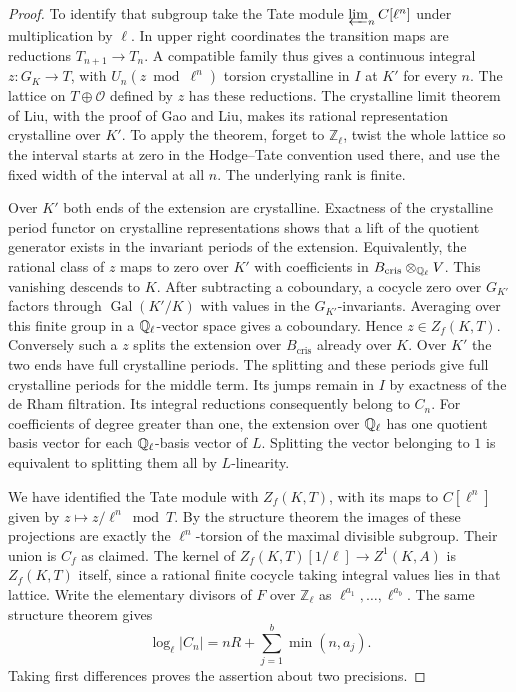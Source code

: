\documentclass[a4paper,11pt]{article}
\theoremstyle{definition}
\theoremstyle{remark}
\newcommand{\ZZ}{\mathbb Z}\newcommand{\ord}{\operatorname{ord}}
\numberwithin{equation}{section}
\begin{document}
\begin{proof}
To identify that subgroup take the Tate module
\(\varprojlim_n C[\ell^n]\) under multiplication by \(\ell\).
In upper right coordinates the transition maps are reductions
\(T_{n+1}\to T_n\). A compatible family thus gives a continuous
integral \(z:G_K\to T\), with \(U_n(z\bmod\ell^n)\) torsion
crystalline in \(I\) at \(K'\) for every \(n\). The lattice on
\(T\oplus\mathcal O\) defined by \(z\) has these reductions.
The crystalline limit theorem of Liu, with the proof of Gao and
Liu, makes its rational representation crystalline over \(K'\).
To apply the theorem, forget to \(\ZZ_\ell\), twist the whole lattice
so the interval starts at zero in the Hodge--Tate convention used
there, and use the fixed width of the interval at all \(n\).
The underlying rank is finite. \cite{II-II-liulimit732,II-II-gaoliulimit732}

Over \(K'\) both ends of the extension are crystalline. Exactness
of the crystalline period functor on crystalline representations
shows that a lift of the quotient generator exists in the invariant
periods of the extension. Equivalently, the rational class of \(z\)
maps to zero over \(K'\) with coefficients in
\(B_{\mathrm{cris}}\otimes_{\mathbb Q_\ell}V\). This vanishing descends
to \(K\). After subtracting a coboundary, a cocycle zero over
\(G_{K'}\) factors through \(\operatorname{Gal}(K'/K)\) with values
in the \(G_{K'}\)-invariants. Averaging over this finite group in a
\(\mathbb Q_\ell\)-vector space gives a coboundary. Hence \(z\in Z_f(K,T)\).
Conversely such a \(z\) splits the extension over
\(B_{\mathrm{cris}}\) already over \(K\). Over \(K'\) the two
ends have full crystalline periods. The splitting and these periods
give full crystalline periods for the middle term. Its jumps remain
in \(I\) by exactness of the de Rham filtration. Its integral
reductions consequently belong to \(C_n\). For coefficients of
degree greater than one, the extension over \(\mathbb Q_\ell\) has one
quotient basis vector for each \(\mathbb Q_\ell\)-basis vector of \(L\).
Splitting the vector belonging to \(1\) is equivalent to splitting
them all by \(L\)-linearity.

We have identified the Tate module with \(Z_f(K,T)\), with its maps
to \(C[\ell^n]\) given by \(z\mapsto z/\ell^n\bmod T\).
By the structure theorem the images of these projections are exactly
the \(\ell^n\)-torsion of the maximal divisible subgroup. Their union
is \(C_f\) as claimed. The kernel of
\(Z_f(K,T)[1/\ell]\to Z^1(K,A)\) is \(Z_f(K,T)\) itself, since a
rational finite cocycle taking integral values lies in that lattice.
Write the elementary divisors of \(F\) over \(\ZZ_\ell\) as
\(\ell^{a_1},\ldots,\ell^{a_b}\). The same structure theorem gives
\[
      \log_\ell|C_n|=nR+\sum_{j=1}^b\min(n,a_j).
\]
Taking first differences proves the assertion about two precisions.
\end{proof}
\end{document}
